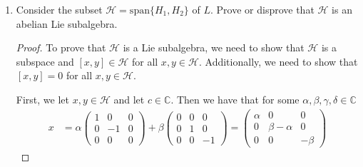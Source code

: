 \documentclass[12pt]{article}
\theoremstyle{definition}
\newenvironment{solution}
{\renewcommand\qedsymbol{$\blacksquare$}\begin{proof}[Solution]}
{\end{proof}}
\begin{document}
\begin{enumerate}
\begin{enumerate}[label=(\alph*)]
\begin{solution}
\begin{equation*}
\begin{split}
\begin{pmatrix}
                                \end{pmatrix}-\begin{pmatrix}0&0&0\\0&0&0\\1&0&0\end{pmatrix}
                                \begin{pmatrix}0&0&0\\0&1&0\\0&0&-1
                                \end{pmatrix}=-Y_3 \\ 
                            \end{split}
                        \end{equation*}
                    \end{solution}
                \item Consider the subset $\mathcal{H}=\text{span}\{H_1, H_2\}$
                    of $L$. Prove or disprove that $\mathcal{H}$ is an abelian
                    Lie subalgebra.
                    \begin{proof}
                        To prove that $\mathcal{H}$ is a Lie subalgebra, we
                        need to show that $\mathcal{H}$ is a subspace and $[x,
                        y]\in\mathcal{H}$ for all $x, y\in\mathcal{H}$.
                        Additionally, we need to show that $[x, y]=0$ for all
                        $x, y\in\mathcal{H}$.\par\hspace{4mm} First, we let
                        $x, y\in\mathcal{H}$ and let $c\in\mathbb{C}$. Then we
                        have that for some $\alpha, \beta, \gamma, \delta\in\mathbb{C}$
                        \begin{equation*}
                            \begin{split}
                                x &=
                                \alpha\begin{pmatrix}1&0&0\\0&-1&0\\0&0&0\end{pmatrix}+\beta
                                \begin{pmatrix}0&0&0\\0&1&0\\0&0&-1\end{pmatrix}=
                                \begin{pmatrix}\alpha&0&0\\0&\beta-\alpha&0\\0&0&-\beta\end{pmatrix}

\end{split}
\end{equation*}
\end{proof}
\end{enumerate}
\end{enumerate}
\end{document}
